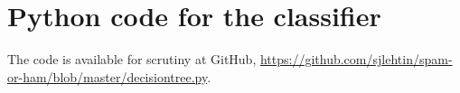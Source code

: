 \documentclass[a4paper,10pt]{article}
\begin{document}
\appendix
\section{Python code for the classifier}

The code is available for scrutiny at GitHub,
\href{https://github.com/sjlehtin/spam-or-ham/blob/master/decisiontree.py}
{https://github.com/sjlehtin/spam-or-ham/blob/master/decisiontree.py}.

% 
%


%


\end{document}
